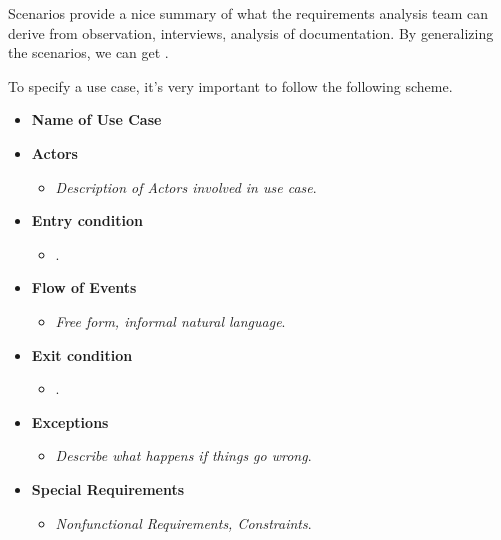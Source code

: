 \newpage

\noindent
Scenarios provide a nice summary of what the requirements analysis team can derive from observation, interviews, analysis of documentation. By generalizing the scenarios, we can get .

\highspace
To specify a use case, it's very important to follow the following scheme.
\begin{definitionbox}
    \begin{itemize}
        \item \textbf{Name of Use Case}
        
        \item \textbf{Actors}
        \begin{itemize}
            \item \emph{Description of Actors involved in use case}.
        \end{itemize}
        
        \item \textbf{Entry condition}
        \begin{itemize}
            \item {}.
        \end{itemize}
        
        \item \textbf{Flow of Events}
        \begin{itemize}
            \item \emph{Free form, informal natural language}.
        \end{itemize}
        
        \item \textbf{Exit condition}
        \begin{itemize}
            \item {}.
        \end{itemize}
        
        \item \textbf{Exceptions}
        \begin{itemize}
            \item \emph{Describe what happens if things go wrong}.
        \end{itemize}
        
        \item \textbf{Special Requirements}
        \begin{itemize}
            \item \emph{Nonfunctional Requirements, Constraints}.
        \end{itemize}
    \end{itemize}
\end{definitionbox}

